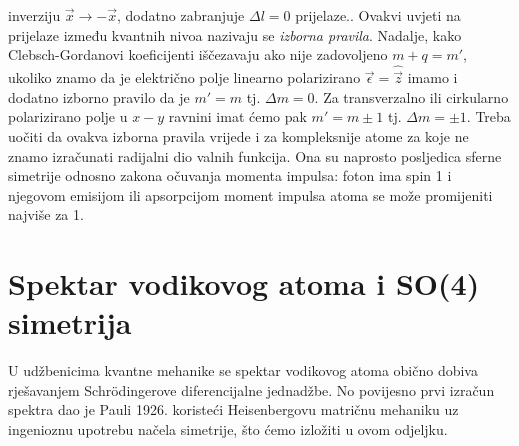 \begin{primjer}
{    inverziju $\vec{x} \to -\vec{x}$, dodatno zabranjuje $\Delta l =0$
prijelaze.}. Ovakvi uvjeti na prijelaze između kvantnih nivoa
nazivaju se \emph{izborna pravila}.
Nadalje, kako Clebsch-Gordanovi koeficijenti iščezavaju ako
nije zadovoljeno $m+q = m'$, ukoliko znamo da je električno
polje linearno polarizirano 
$\vec{\epsilon} = \hat{\vec{z}}$ imamo i dodatno izborno
pravilo da je $m'=m$ tj. $\Delta m = 0$. Za transverzalno
ili cirkularno polarizirano polje u $x-y$ ravnini imat ćemo
pak $m'= m\pm 1$ tj. $\Delta m = \pm 1$.
Treba uočiti da ovakva izborna pravila vrijede i za kompleksnije
atome za koje ne znamo izračunati radijalni dio valnih funkcija.
Ona su naprosto posljedica sferne simetrije odnosno zakona očuvanja
momenta impulsa: foton ima spin 1 i njegovom emisijom ili apsorpcijom
moment impulsa atoma se može promijeniti najviše za 1.
\end{primjer}



\section{Spektar vodikovog atoma i SO(4) simetrija}
\label{sec:so4}

U udžbenicima kvantne mehanike se spektar vodikovog atoma obično
dobiva rješavanjem Schr\"{o}dingerove diferencijalne jednadžbe.
No povijesno prvi izračun spektra dao je Pauli 1926.
koristeći Heisenbergovu matričnu mehaniku uz
ingenioznu upotrebu načela simetrije, što ćemo izložiti u ovom odjeljku.


